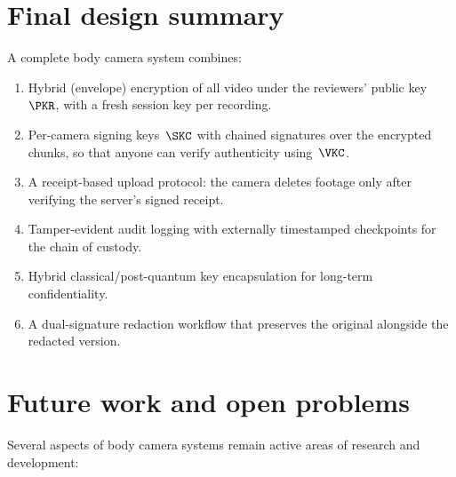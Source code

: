 \section{Final design summary}

A complete body camera system combines:
\begin{enumerate}
  \item Hybrid (envelope) encryption of all video under the reviewers'
    public key~\(\PKR\), with a fresh session key per recording.
  \item Per-camera signing keys~\(\SKC\) with chained signatures over the
    encrypted chunks, so that anyone can verify authenticity
    using~\(\VKC\).
  \item A receipt-based upload protocol: the camera deletes footage only
    after verifying the server's signed receipt.
  \item Tamper-evident audit logging with externally timestamped
    checkpoints for the chain of custody.
  \item Hybrid classical/post-quantum key encapsulation for long-term
    confidentiality.
  \item A dual-signature redaction workflow that preserves the original
    alongside the redacted version.
\end{enumerate}


\section{Future work and open problems}\label{FutureWork}


Several aspects of body camera systems remain active areas of research and
development:

